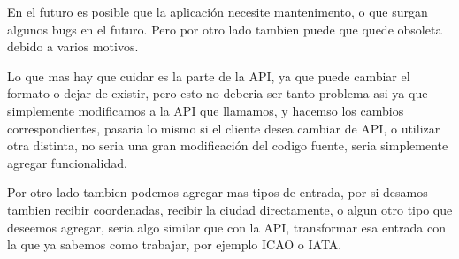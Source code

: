 En el futuro es posible que la aplicación necesite mantenimento, o que surgan algunos bugs en el futuro. Pero por otro lado tambien puede
que quede obsoleta debido a varios motivos.

Lo que mas hay que cuidar es la parte de la API, ya que puede cambiar el formato o dejar de existir, pero esto no deberia ser tanto problema
asi ya que simplemente modificamos a la API que llamamos, y hacemso los cambios correspondientes, pasaria lo mismo si el cliente desea cambiar
de API, o utilizar otra distinta, no seria una gran modificación del codigo fuente, seria simplemente agregar funcionalidad. 

Por otro lado tambien podemos agregar mas tipos de entrada, por si desamos tambien recibir coordenadas, recibir la ciudad directamente, 
o algun otro tipo que deseemos agregar, seria algo similar que con la API, transformar esa entrada con la que ya sabemos como trabajar,
por ejemplo ICAO o IATA.